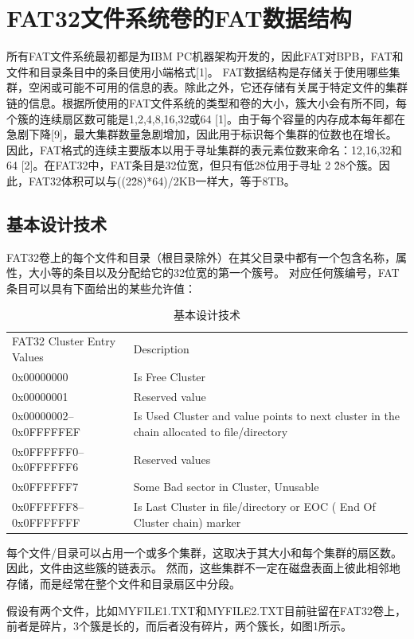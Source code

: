 \chapter{FAT32文件系统卷的FAT数据结构}

所有FAT文件系统最初都是为IBM PC机器架构开发的，因此FAT对BPB，FAT和文件和目录条目中的条目使用小端格式[1]。 FAT数据结构是存储关于使用哪些集群，空闲或可能不可用的信息的表。除此之外，它还存储有关属于特定文件的集群链的信息。根据所使用的FAT文件系统的类型和卷的大小，簇大小会有所不同，每个簇的连续扇区数可能是1,2,4,8,16,32或64 [1]。由于每个容量的内存成本每年都在急剧下降[9]，最大集群数量急剧增加，因此用于标识每个集群的位数也在增长。因此，FAT格式的连续主要版本以用于寻址集群的表元素位数来命名：12,16,32和64 [2]。在FAT32中，FAT条目是32位宽，但只有低28位用于寻址
2 \^ 28个簇。因此，FAT32体积可以与((2\^28)*64)/2KB一样大，等于8TB。

\section{基本设计技术}
FAT32卷上的每个文件和目录（根目录除外）在其父目录中都有一个包含名称，属性，大小等的条目以及分配给它的32位宽的第一个簇号。 对应任何簇编号，FAT条目可以具有下面给出的某些允许值：

\begin{table}[htbp]
	\centering
	\caption[基本设计技术]{基本设计技术}
	\begin{tabular}{lp{7cm}}
		\hline
		FAT32 Cluster Entry Values & Description \\
		0x00000000 &  Is Free Cluster \\
		0x00000001&Reserved value\\
		0x00000002–0x0FFFFFEF& Is Used Cluster and value points to next
		cluster in the chain allocated to file/directory\\
		0x0FFFFFF0–0x0FFFFFF6& Reserved values\\
		0x0FFFFFF7&Some Bad sector in Cluster, Unusable\\
		0x0FFFFFF8–0x0FFFFFFF&Is Last Cluster in file/directory or EOC
		( End Of Cluster chain) marker\\
		\hline
	\end{tabular}
\end{table}

每个文件/目录可以占用一个或多个集群，这取决于其大小和每个集群的扇区数。 因此，文件由这些簇的链表示。 然而，这些集群不一定在磁盘表面上彼此相邻地存储，而是经常在整个文件和目录扇区中分段。

\par
假设有两个文件，比如MYFILE1.TXT和MYFILE2.TXT目前驻留在FAT32卷上，前者是碎片，3个簇是长的，而后者没有碎片，两个簇长，如图1所示。

